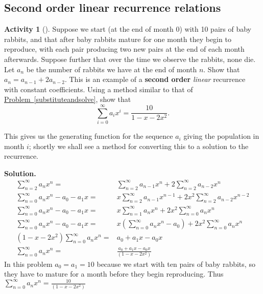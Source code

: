 \documentclass[10pt,]{book}
\newcommand{\terminology}[1]{\textbf{#1}}
\theoremstyle{plain}
\theoremstyle{definition}
\newtheorem{activity}[project]{Activity}
\numberwithin{equation}{chapter}
\newcommand{\amp}{&}
\begin{document}
\subsection[{Second order linear recurrence relations}]{Second order linear recurrence relations}\label{subsection-48}
\begin{activity}[]\label{secondorderintroduction}
Suppose we start (at the end of month 0) with 10 pairs of baby rabbits, and that after baby rabbits mature for one month they begin to reproduce, with each pair producing two new pairs at the end of each month afterwards. Suppose further that over the time we observe the rabbits, none die. Let \(a_n\) be the number of rabbits we have at the end of month \(n\). Show that \(a_n=a_{n-1} + 2a_{n-2}\). This is an example of a \terminology{second order} \emph{linear} recurrence with constant coefficients. Using a method similar to that of \hyperref[substituteandsolve]{Problem~\ref{substituteandsolve}}, show that%
\begin{equation*}
\sum_{i=0}^\infty a_ix^i = \frac{10}{1-x-2x^2}.
\end{equation*}
%
\par
This gives us the generating function for the sequence \(a_i\) giving the population in month \(i\); shortly we shall see a method for converting this to a solution to the recurrence.%
\par\medskip\noindent%
\textbf{Solution.}\quad %
\begin{align*}
\sum_{n=2}^\infty a_nx^n =\amp \sum_{n=2}^\infty a_{n-1}x^n +
2\sum_{n=2}^\infty a_{n-2}x^n\\
\sum_{n=0}^\infty a_nx^n -a_0-a_1x  =\amp x\sum_{n=2}^\infty a_{n-1}x^{n-1} +
2x^2\sum_{n=2}^\infty a_{n-2}x^{n-2}\\
\sum_{n=0}^\infty a_nx^n -a_0-a_1x =\amp x\sum_{n=1}^\infty a_{n}x^{n} +
2x^2\sum_{n=0}^\infty a_{n}x^n\\
\sum_{n=0}^\infty a_nx^n -a_0-a_1x =\amp x\left(\sum_{n=0}^\infty
a_{n}x^{n}-a_0\right) + 2x^2\sum_{n=0}^\infty a_{n}x^n\\
(1-x-2x^2)\sum_{n=0}^\infty a_nx^n =\amp a_0+a_1x-a_0x\\
\sum_{n=0}^\infty a_nx^n =\amp \frac{a_0+a_1x-a_0x}{(1-x-2x^2)}
\end{align*}
In this problem \(a_0=a_1=10\) because we start with ten pairs of baby rabbits, so they have to mature for a month before they begin reproducing. Thus \(\displaystyle\sum_{n=0}^\infty a_nx^n = \frac{10}{(1-x-2x^2)}\)%
\end{activity}
\end{document}
